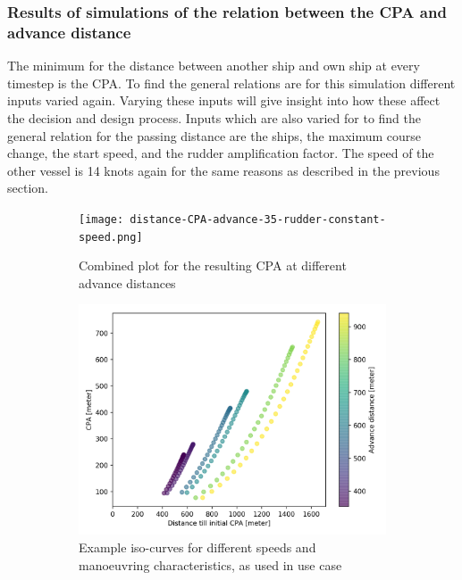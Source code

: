 \subsubsection{Results of simulations of the relation between the CPA and advance distance}
The minimum for the distance between another ship and own ship at every timestep is the \ac{CPA}. To find the general relations are for this simulation different inputs varied again. Varying these inputs will give insight into how these affect the decision and design process.
Inputs which are also varied for to find the general relation for the passing distance are the ships, the maximum course change, the start speed, and the rudder amplification factor. The speed of the other vessel is 14 knots again for the same reasons as described in the previous section.

\begin{figure}[!p]
	\centering
	\begin{subfigure}[b]{\textwidth}
		\centering
		\texttt{[image: distance-CPA-advance-35-rudder-constant-speed.png]}
		\caption{Combined plot for the resulting CPA at different advance distances}
		\label{fig:distance-CPA-advance}
	\end{subfigure}
	\begin{subfigure}[b]{0.6\linewidth}
		\includegraphics[width=\textwidth]{figure/distsance-CPA-course-50}
		\caption{Example iso-curves for different speeds and manoeuvring characteristics, as used in use case}
		\label{fig:distsance-cpa-course-50}
	\end{subfigure}
	\begin{subfigure}[b]{0.6\textwidth}

\end{subfigure}
\end{figure}
